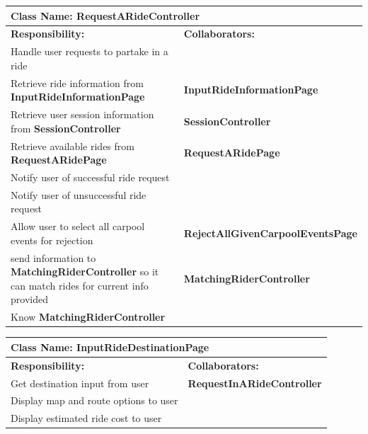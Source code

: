 \documentclass[]{article}
\begin{document}
\begin{table}[H]
    \centering
    \begin{tabular}{|p{5cm}|p{5cm}|}
    \hline 
     \multicolumn{2}{|l|}{\textbf{Class Name:} RequestARideController} \\
    \hline
    \textbf{Responsibility:} & \textbf{Collaborators:} \\
    \hline
    Handle user requests to partake in a ride &  \phantom{} \\
    \hline
    Retrieve ride information from \textbf{InputRideInformationPage} & \textbf{InputRideInformationPage} \\
    \hline
    Retrieve user session information from \textbf{SessionController} & \textbf{SessionController} \\
    \hline
    Retrieve available rides from \textbf{RequestARidePage} & \textbf{RequestARidePage} \\
    \hline
    Notify user of successful ride request & \phantom{} \\
    \hline
    Notify user of unsuccessful ride request & \phantom{} \\
    \hline
    Allow user to select all carpool events for rejection & \textbf{RejectAllGivenCarpoolEventsPage}\\ 
    \hline
    send information to \textbf{MatchingRiderController} so it can match rides for current info provided &\textbf{MatchingRiderController}\\
    \hline
    Know \textbf{MatchingRiderController}  & \phantom{} \\
    \hline
    
    \end{tabular}
\end{table}

\begin{table}[H]
    \centering
    \begin{tabular}{|p{5cm}|p{5cm}|}
        \hline 
        \multicolumn{2}{|l|}{\textbf{Class Name:} InputRideDestinationPage} \\
        \hline
        \textbf{Responsibility:} & \textbf{Collaborators:} \\
        \hline
        Get destination input from user & \textbf{RequestInARideController} \\
        \hline
        Display map and route options to user & \phantom{} \\
        \hline
        Display estimated ride cost to user & \phantom{} \\
        \hline
        
    \end{tabular}
\end{table}
\end{document}
